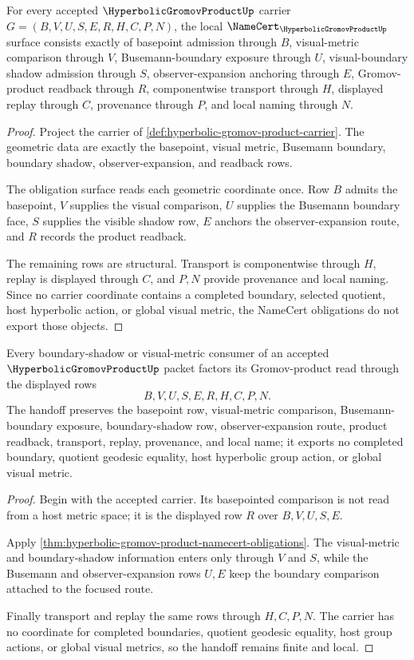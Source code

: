 \begin{theorem}
\label{thm:hyperbolic-gromov-product-namecert-obligations}
For every accepted $\HyperbolicGromovProductUp$ carrier $G=(B,V,U,S,E,R,H,C,P,N)$, the local $\NameCert_{\HyperbolicGromovProductUp}$ surface consists exactly of basepoint admission through $B$, visual-metric comparison through $V$, Busemann-boundary exposure through $U$, visual-boundary shadow admission through $S$, observer-expansion anchoring through $E$, Gromov-product readback through $R$, componentwise transport through $H$, displayed replay through $C$, provenance through $P$, and local naming through $N$.
\end{theorem}
\begin{proof}
Project the carrier of \autoref{def:hyperbolic-gromov-product-carrier}. The geometric data are exactly the basepoint, visual metric, Busemann boundary, boundary shadow, observer-expansion, and readback rows.

The obligation surface reads each geometric coordinate once. Row $B$ admits the basepoint, $V$ supplies the visual comparison, $U$ supplies the Busemann boundary face, $S$ supplies the visible shadow row, $E$ anchors the observer-expansion route, and $R$ records the product readback.

The remaining rows are structural. Transport is componentwise through $H$, replay is displayed through $C$, and $P,N$ provide provenance and local naming. Since no carrier coordinate contains a completed boundary, selected quotient, host hyperbolic action, or global visual metric, the NameCert obligations do not export those objects.
\end{proof}

\begin{theorem}
\label{thm:hyperbolic-gromov-product-boundary-shadow-handoff}
Every boundary-shadow or visual-metric consumer of an accepted $\HyperbolicGromovProductUp$ packet factors its Gromov-product read through the displayed rows
$$
B,V,U,S,E,R,H,C,P,N .
$$
The handoff preserves the basepoint row, visual-metric comparison, Busemann-boundary exposure, boundary-shadow row, observer-expansion route, product readback, transport, replay, provenance, and local name; it exports no completed boundary, quotient geodesic equality, host hyperbolic group action, or global visual metric.
\end{theorem}
\begin{proof}
Begin with the accepted carrier. Its basepointed comparison is not read from a host metric space; it is the displayed row $R$ over $B,V,U,S,E$.

Apply \autoref{thm:hyperbolic-gromov-product-namecert-obligations}. The visual-metric and boundary-shadow information enters only through $V$ and $S$, while the Busemann and observer-expansion rows $U,E$ keep the boundary comparison attached to the focused route.

Finally transport and replay the same rows through $H,C,P,N$. The carrier has no coordinate for completed boundaries, quotient geodesic equality, host group actions, or global visual metrics, so the handoff remains finite and local.
\end{proof}

